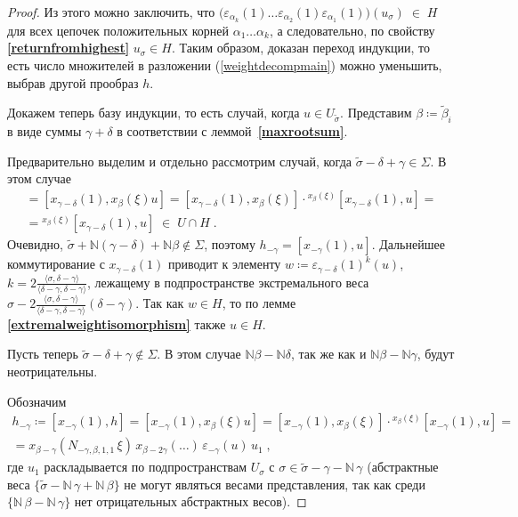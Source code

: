 \documentclass[12pt]{matmex-diploma}
\theoremstyle{mystyleni}
\theoremstyle{mystyle}
\newcommand\refb[1]{\textbf{\ref{#1}}}
\newcommand{\N}{\mathbb{N}}
\begin{document}
\begin{proof}
Из этого можно заключить, что $\big(\varepsilon_{\alpha_k}(1)\ldots\varepsilon_{\alpha_2}(1)\varepsilon_{\alpha_1}(1)\big)(u_\sigma) \; \in \; H$ для всех цепочек положительных корней $\alpha_1\ldots\alpha_k$, а следовательно, по свойству \refb{returnfromhighest} $u_\sigma \in H$. Таким образом, доказан переход индукции, то есть число множителей в разложении (\ref{weightdecompmain}) можно уменьшить, выбрав другой прообраз $h$.

Докажем теперь базу индукции, то есть случай, когда $u \in  U_{\widetilde\sigma}$.
Представим $\beta\coloneqq\widetilde\beta_i$ в виде суммы $\gamma+\delta$ в соответствии с леммой~\refb{maxrootsum}.

\pagebreak


Предварительно выделим и отдельно рассмотрим случай, когда $\widetilde\sigma-\delta+\gamma \in \Sigma$. В этом случае
\begin{multline*}
[x_{\gamma-\delta}(1),h] = [x_{\gamma-\delta}(1),x_\beta(\xi)u] = [x_{\gamma-\delta}(1),x_\beta(\xi)] \cdot {}^{x_\beta(\xi)}[x_{\gamma-\delta}(1),u] =\\=
{}^{x_\beta(\xi)}[x_{\gamma-\delta}(1),u] \;\in\; U\cap H \;.
\end{multline*}
Очевидно, $\widetilde\sigma + \N(\gamma-\delta)+\N\beta \notin \Sigma$, поэтому
$h_{-\gamma} = [x_{-\gamma}(1),u]$. Дальнейшее коммутирование с $x_{\gamma-\delta}(1)$ приводит к элементу $w\coloneqq\varepsilon_{\gamma-\delta}(1)^k(u)$, $k=2\frac{\langle\sigma,\delta-\gamma\rangle}{\langle\delta-\gamma,\delta-\gamma\rangle}$, лежащему в подпространстве экстремального веса $\sigma-2\frac{\langle\sigma,\delta-\gamma\rangle}{\langle\delta-\gamma,\delta-\gamma\rangle}(\delta-\gamma)$. Так как $w\in H$, то по лемме \refb{extremalweightisomorphism} также $u \in H$.

Пусть теперь $\widetilde\sigma-\delta+\gamma \notin \Sigma$. В этом случае $\N\beta-\N\delta$, так же как и $\N\beta-\N\gamma$, будут неотрицательны.

Обозначим
\begin{multline*}
h_{-\gamma} \coloneqq [x_{-\gamma}(1),h] = [x_{-\gamma}(1),x_\beta(\xi) u] = [x_{-\gamma}(1),x_\beta(\xi)] \cdot {}^{x_\beta(\xi)}[x_{-\gamma}(1),u] = \\ =
x_{\beta-\gamma}(N_{-\gamma,\beta,1,1} \,\xi) \, x_{\beta-2\gamma}(\ldots) \, \varepsilon_{-\gamma}(u) \, u_1 \; ,
\end{multline*}
где $u_1$ раскладывается по подпространствам $U_\sigma$ с $\sigma \in \widetilde\sigma-\gamma - \N \, \gamma$ (абстрактные веса $\{\widetilde\sigma-\N\,\gamma+\N\,\beta\}$ не могут являться весами представления, так как среди $\{\N\,\beta-\N\,\gamma\}$ нет отрицательных абстрактных весов).


\end{proof}
\end{document}
